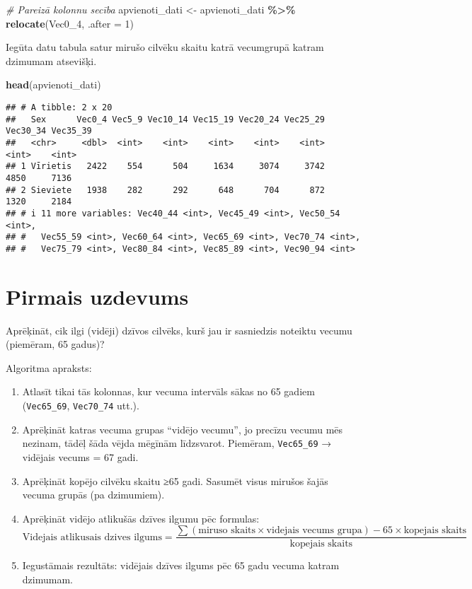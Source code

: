 \documentclass[
]{article}
\newenvironment{Shaded}{\begin{snugshade}}{\end{snugshade}}
\newcommand{\AttributeTok}[1]{\textcolor[rgb]{0.13,0.29,0.53}{#1}}
\newcommand{\CommentTok}[1]{\textcolor[rgb]{0.56,0.35,0.01}{\textit{#1}}}
\newcommand{\DecValTok}[1]{\textcolor[rgb]{0.00,0.00,0.81}{#1}}
\newcommand{\FunctionTok}[1]{\textcolor[rgb]{0.13,0.29,0.53}{\textbf{#1}}}
\newcommand{\NormalTok}[1]{#1}
\newcommand{\OtherTok}[1]{\textcolor[rgb]{0.56,0.35,0.01}{#1}}
\newcommand{\SpecialCharTok}[1]{\textcolor[rgb]{0.81,0.36,0.00}{\textbf{#1}}}
\begin{document}
\begin{Shaded}
\begin{Highlighting}[]
\CommentTok{\# Pareizā kolonnu secība }
\NormalTok{apvienoti\_dati }\OtherTok{\textless{}{-}}\NormalTok{ apvienoti\_dati }\SpecialCharTok{\%\textgreater{}\%}
  \FunctionTok{relocate}\NormalTok{(Vec0\_4, }\AttributeTok{.after =} \DecValTok{1}\NormalTok{)}
\end{Highlighting}
\end{Shaded}

Iegūta datu tabula satur mirušo cilvēku skaitu katrā vecumgrupā katram
dzimumam atsevišķi.

\begin{Shaded}
\begin{Highlighting}[]
\FunctionTok{head}\NormalTok{(apvienoti\_dati)}
\end{Highlighting}
\end{Shaded}

\begin{verbatim}
## # A tibble: 2 x 20
##   Sex      Vec0_4 Vec5_9 Vec10_14 Vec15_19 Vec20_24 Vec25_29 Vec30_34 Vec35_39
##   <chr>     <dbl>  <int>    <int>    <int>    <int>    <int>    <int>    <int>
## 1 Vīrietis   2422    554      504     1634     3074     3742     4850     7136
## 2 Sieviete   1938    282      292      648      704      872     1320     2184
## # i 11 more variables: Vec40_44 <int>, Vec45_49 <int>, Vec50_54 <int>,
## #   Vec55_59 <int>, Vec60_64 <int>, Vec65_69 <int>, Vec70_74 <int>,
## #   Vec75_79 <int>, Vec80_84 <int>, Vec85_89 <int>, Vec90_94 <int>
\end{verbatim}

\section{Pirmais uzdevums}\label{pirmais-uzdevums}

Aprēķināt, cik ilgi (vidēji) dzīvos cilvēks, kurš jau ir sasniedzis
noteiktu vecumu (piemēram, 65 gadus)?

Algoritma apraksts:

\begin{enumerate}
\def\labelenumi{\arabic{enumi}.}
\item
  Atlasīt tikai tās kolonnas, kur vecuma intervāls sākas no 65 gadiem
  (\texttt{Vec65\_69}, \texttt{Vec70\_74} utt.).
\item
  Aprēķināt katras vecuma grupas ``vidējo vecumu'', jo precīzu vecumu
  mēs nezinam, tādēļ šāda vējda mēgīnām līdzsvarot. Piemēram,
  \texttt{Vec65\_69} → vidējais vecums = 67 gadi.
\item
  Aprēķināt kopējo cilvēku skaitu ≥65 gadi. Sasumēt visus mirušos šajās
  vecuma grupās (pa dzimumiem).
\item
  Aprēķināt vidējo atlikušās dzīves ilgumu pēc formulas:\\
  \[
  \text{Videjais atlikusais dzives ilgums} = \frac{\sum (\text{miruso skaits} \times \text{videjais vecums grupa}) - 65 \times \text{kopejais skaits}}{\text{kopejais skaits}}
  \]
\item
  Iegustāmais rezultāts: vidējais dzīves ilgums pēc 65 gadu vecuma
  katram dzimumam.
\end{enumerate}
\end{document}
